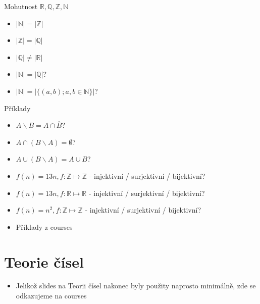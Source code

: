 \documentclass[aspectratio=1610]{beamer}
\begin{document}
\begin{frame}{Mohutnost $\mathbb{R}, \mathbb{Q}, \mathbb{Z}, \mathbb{N}$}

\begin{itemize}
  \item $|\mathbb{N}| = |\mathbb{Z}|$
  \item $|\mathbb{Z}| = |\mathbb{Q}|$
  \item $|\mathbb{Q}| \neq |\mathbb{R}|$
  \item $|\mathbb{N}| = |\mathbb{Q}|$?
  \item $|\mathbb{N}| = |\{(a, b); a,b \in \mathbb{N}\}|$?

\end{itemize}

\end{frame}

\begin{frame}{Příklady}

\begin{itemize}
  \item $A \backslash B = A \cap \overline{B}$?
  \item $A \cap (B \backslash A) = \emptyset$?
  \item $A \cup (B \backslash A) = A \cup B$?

  \item $f(n) = 13n, f: \mathbb{Z} \mapsto \mathbb{Z}$ - injektivní / surjektivní / bijektivní?
  \item $f(n) = 13n, f: \mathbb{R} \mapsto \mathbb{R}$ - injektivní / surjektivní / bijektivní?
  \item $f(n) = n^2, f: \mathbb{Z} \mapsto \mathbb{Z}$ - injektivní / surjektivní / bijektivní?

  \item Příklady z courses\cite{courses:DMLsetexercises}
\end{itemize}

\end{frame}

\section{Teorie čísel}

\begin{frame}

\begin{itemize}
  \item Jelikož slides na Teorii čísel nakonec byly použity naprosto minimálně, zde se odkazujeme na courses
\end{itemize}

\end{frame}
\end{document}
